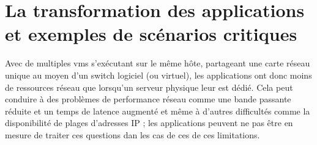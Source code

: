 \section{La transformation des applications et exemples de scénarios critiques}

Avec de multiples \glspl{vm} s'exécutant sur le même hôte, partageant une carte réseau unique au moyen d'un switch logiciel (ou virtuel), les applications ont donc moins de ressources réseau que lorsqu'un serveur physique leur est dédié. Cela peut conduire à des problèmes de performance réseau comme une bande passante réduite et un temps de latence augmenté et même à d'autres difficultés comme la disponibilité de plages d'adresses IP ; les applications peuvent ne pas être en mesure de traiter ces questions dan les cas de ces de ces limitations.




